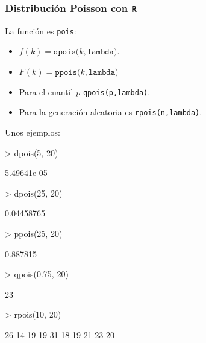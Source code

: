 \begin{frame}[fragile]
\frametitle{Distribución Poisson con \texttt{R}}
La función es  \texttt{pois}:
\begin{itemize}
\item $f(k)=\texttt{dpois(}k,\texttt{lambda)}$.
\item $F(k)=\texttt{ppois(}k,\texttt{lambda)}$
\item Para el cuantil $p$  \verb+qpois(p,lambda)+.
\item Para la generación aleatoria es \verb+rpois(n,lambda)+.
\end{itemize}
\end{frame}

\begin{frame}[fragile]

Unos ejemplos:

\begin{Schunk}
\begin{Sinput}
> dpois(5, 20)
\end{Sinput}
\begin{Soutput}
[1] 5.49641e-05
\end{Soutput}
\begin{Sinput}
> dpois(25, 20)
\end{Sinput}
\begin{Soutput}
[1] 0.04458765
\end{Soutput}
\begin{Sinput}
> ppois(25, 20)
\end{Sinput}
\begin{Soutput}
[1] 0.887815
\end{Soutput}
\begin{Sinput}
> qpois(0.75, 20)
\end{Sinput}
\begin{Soutput}
[1] 23
\end{Soutput}
\begin{Sinput}
> rpois(10, 20)
\end{Sinput}
\begin{Soutput}
 [1] 26 14 19 19 31 18 19 21 23 20
\end{Soutput}
\end{Schunk}

\end{frame}

